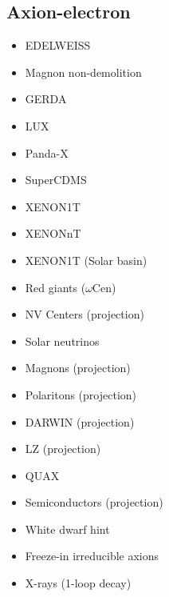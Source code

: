\documentclass[9pt,twocolumn]{extarticle}
\begin{document}
\begin{mdframed}
\vspace{-1em}
\section{Axion-electron}\vspace{-0.5em}
\begin{itemize}\setlength\itemsep{-0.5em}
    \item EDELWEISS~\cite{EDELWEISS:2018tde}
    \item Magnon non-demolition~\cite{Ikeda:2021mlv}
    \item GERDA~\cite{GERDA:2020emj}
    \item LUX~\cite{LUX:2017glr}
    \item Panda-X~\cite{PandaX:2017ock}
    \item SuperCDMS~\cite{SuperCDMS:2019jxx}
    \item XENON1T~\cite{XENON:2019gfn,XENON:2020rca}
    \item XENONnT~\cite{XENONCollaboration:2022kmb}
    \item XENON1T (Solar basin)~\cite{VanTilburg:2020jvl}
    \item Red giants ($\omega$Cen)~\cite{Capozzi:2020cbu}
	\item NV Centers (projection)~\cite{Chigusa:2023hms}
    \item Solar neutrinos~\cite{Gondolo:2008dd}
    \item Magnons (projection)~\cite{Chigusa:2020gfs}
        \item Polaritons (projection)~\cite{Mitridate:2020kly}
    \item DARWIN (projection)~\cite{DARWIN:2016hyl}
    \item LZ (projection)~\cite{LZ:2021xov}
    \item QUAX~\cite{Crescini:2018qrz,QUAX:2020adt}
  	\item Semiconductors (projection)~\cite{Bloch:2016sjj}
  	\item White dwarf hint~\cite{Giannotti:2017hny}
  	\item Freeze-in irreducible axions~\cite{Langhoff:2022bij}
  	\item X-rays (1-loop decay)~\cite{Ferreira:2022egk}
\end{itemize}
\end{mdframed}
\end{document}
